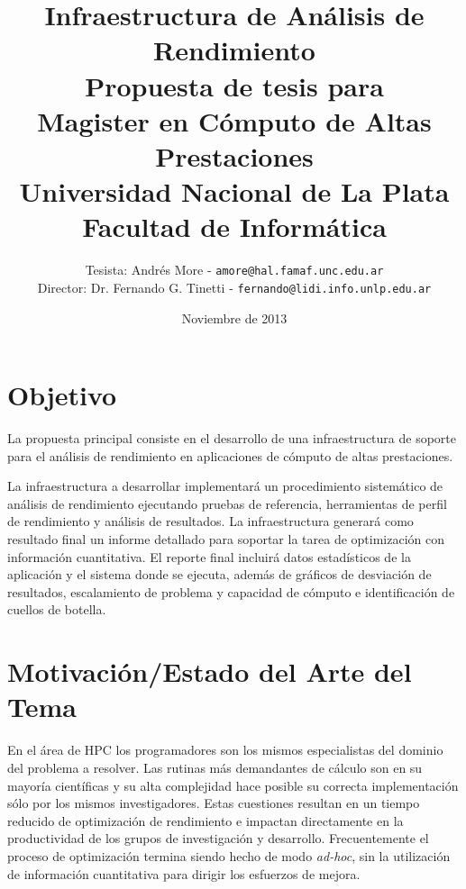\documentclass[a4paper]{article}
\begin{document}
\title{Infraestructura de Análisis de Rendimiento\\
\bigskip
{\large Propuesta de tesis para\\} Magister en Cómputo de Altas Prestaciones\\
\bigskip
Universidad Nacional de La Plata\\
Facultad de Informática\\
\bigskip
}

\author{Tesista: Andrés More - {\tt amore@hal.famaf.unc.edu.ar}\\
Director: Dr. Fernando G. Tinetti - {\tt fernando@lidi.info.unlp.edu.ar}}

\date{Noviembre de 2013}

\maketitle

\newpage

\section{Objetivo}

La propuesta principal consiste en el desarrollo de una infraestructura de soporte para el análisis de rendimiento en aplicaciones de cómputo de altas prestaciones.

\bigskip

La infraestructura a desarrollar implementará un procedimiento sistemático de análisis de rendimiento ejecutando pruebas de referencia, herramientas de perfil de rendimiento y análisis de resultados.  La infraestructura generará como resultado final un informe detallado para soportar la tarea de optimización con información cuantitativa. El reporte final incluirá datos estadísticos de la aplicación y el sistema donde se ejecuta, además de gráficos de desviación de resultados, escalamiento de problema y capacidad de cómputo e identificación de cuellos de botella.

\section{Motivación/Estado del Arte del Tema}

En el área de HPC los programadores son los mismos especialistas del dominio del problema a resolver. Las rutinas
más demandantes de cálculo son en su mayoría científicas y su alta complejidad hace posible su correcta implementación sólo por los mismos investigadores. Estas cuestiones resultan en un tiempo reducido de optimización de rendimiento
e impactan directamente en la productividad de los grupos de investigación y desarrollo. Frecuentemente el proceso de optimización termina siendo hecho de modo {\it ad-hoc}, sin la utilización de información cuantitativa para dirigir los
esfuerzos de mejora.
\end{document}
